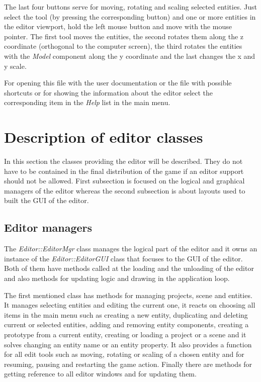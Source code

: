 The last four buttons serve for moving, rotating and scaling selected entities. Just select the tool (by pressing the corresponding button) and one or more entities in the editor viewport, hold the left mouse button and move with the mouse pointer. The first tool moves the entities, the second rotates them along the z coordinate (orthogonal to the computer screen), the third rotates the entities with the \emph{Model} component along the y coordinate and the last changes the x and y scale.

For opening this file with the user documentation or the file with possible shortcuts or for showing the information about the editor select the corresponding item in the \emph{Help} list in the main menu.

\section{Description of editor classes}

In this section the classes providing the editor will be described. They do not have to be contained in the final distribution of the game if an editor support should not be allowed. First subsection is focused on the logical and graphical managers of the editor whereas the second subsection is about layouts used to built the GUI of the editor.

\subsection{Editor managers}

The \emph{Editor::EditorMgr} class manages the logical part of the editor and it owns an instance of the \emph{Editor::EditorGUI} class that focuses to the GUI of the editor. Both of them have methods called at the loading and the unloading of the editor and also methods for updating logic and drawing in the application loop.

The first mentioned class has methods for managing projects, scene and entities. It manages selecting entities and editing the current one, it reacts on choosing all items in the main menu such as creating a new entity, duplicating and deleting current or selected entities, adding and removing entity components, creating a prototype from a current entity, creating or loading a project or a scene and it solves changing an entity name or an entity property. It also provides a function for all edit tools such as moving, rotating or scaling of a chosen entity and for resuming, pausing and restarting the game action. Finally there are methods for getting reference to all editor windows and for updating them.

